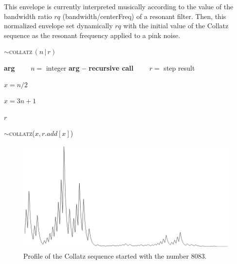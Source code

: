 
  

This envelope is currently interpreted musically according to the value of the bandwidth ratio $rq$ (bandwidth/centerFreq) of a resonant filter.  Then, this normalized envelope set dynamically $rq$ with the initial value of the Collatz sequence as the resonant frequency applied to a pink noise.

\smallskip

\begin{algorithm}
\caption{$\sim$\textsc{collatz}$\,(n \,|\, r)$}\label{collatz}
\begin{algorithmic}%

\State \textbf{arg}
\State $\qquad n=$ integer
\State \textbf{arg -- recursive call}
\State $\qquad r=$ step result
\State


$x=n/2$

\Else 

$x=3n+1$
\EndIf
\State
{} 

\Return $r$

\Else

$\sim$\textsc{collatz}($x,r.add[x]$)
\EndIf

\end{algorithmic}
\end{algorithm}

\begin{figure}[H]
\begin{center}
\includegraphics[scale=0.46]{img/8083.png}
\caption{Profile of the Collatz sequence started with the number 8083.}
\label{coltz}
\end{center}
\end{figure}


